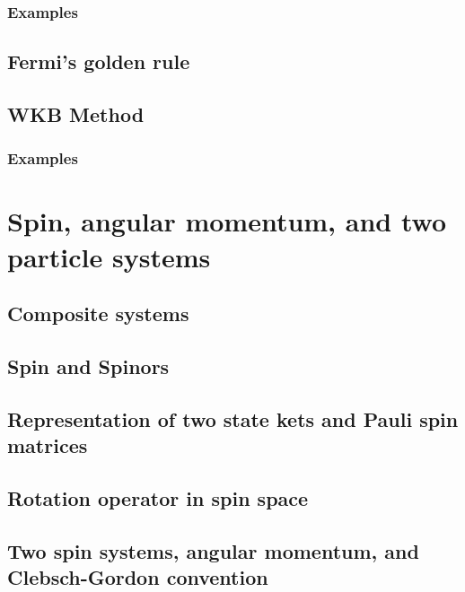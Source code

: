       \section{Examples}
         
   \chapter{Fermi's golden rule}
      
      
   \chapter{WKB Method}
      
      \section{Examples}
         

\part{Spin, angular momentum, and two particle systems}

   \chapter{Composite systems}
      
   \chapter{Spin and Spinors}
      
      
   \chapter{Representation of two state kets and Pauli spin matrices}
      
   \chapter{Rotation operator in spin space}
      
      
   \chapter{Two spin systems, angular momentum, and Clebsch-Gordon convention}
      
      
      
